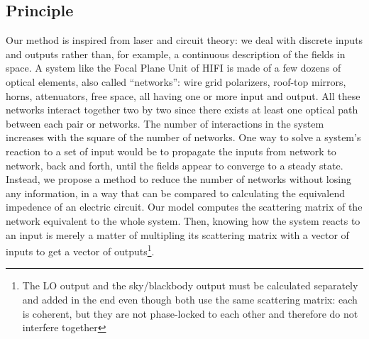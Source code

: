 \documentclass[a4paper,11pt]{article}
\begin{document}
\subsection{Principle}
Our method is inspired from laser and circuit theory: we deal with discrete inputs and outputs rather than, for example, a continuous description of the fields in space.
A system like the Focal Plane Unit of HIFI is made of a few dozens of optical elements, also called ``networks'': wire grid polarizers, roof-top mirrors, horns, attenuators, free space, all having one or more input and output.
All these networks interact together two by two since there exists at least one optical path between each pair or networks.
The number of interactions in the system increases with the square of the number of networks.
One way to solve a system's reaction to a set of input would be to propagate the inputs from network to network, back and forth, until the fields appear to converge to a steady state.
Instead, we propose a method to reduce the number of networks without losing any information, in a way that can be compared to calculating the equivalend impedence of an electric circuit.
Our model computes the scattering matrix of the network equivalent to the whole system.
Then, knowing how the system reacts to an input is merely a matter of multipling its scattering matrix with a vector of inputs to get a vector of outputs\footnote{The LO output and the sky/blackbody output must be calculated separately and added in the end even though both use the same scattering matrix: each is coherent, but they are not phase-locked to each other and therefore do not interfere together}.
\end{document}
